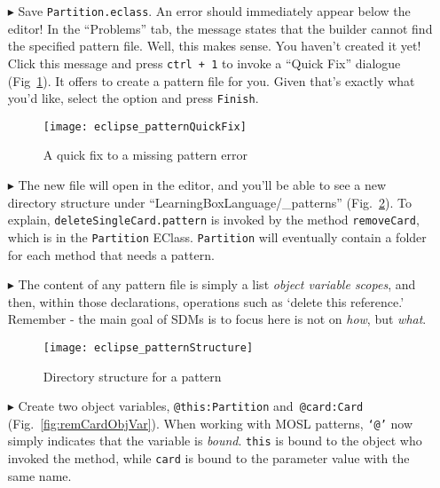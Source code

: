 \begin{itemize}
\item[$\blacktriangleright$] Save \texttt{Partition.eclass}. An error should immediately appear below the editor! In the ``Problems'' tab, the message
states that the builder cannot find the specified pattern file. Well, this makes sense. You haven't created it yet! Click this message and press \texttt{ctrl +
1} to invoke a ``Quick Fix'' dialogue (Fig~\ref{fig:quixFix}). It offers to create a pattern file for you. Given that's exactly what you'd like, select the option
and press \texttt{Finish}.

\vspace{0.5cm}

\begin{figure}[htp]
\begin{center}
  \texttt{[image: eclipse\_patternQuickFix]}
  \caption{A quick fix to a missing pattern error}
  \label{fig:quixFix}
\end{center}
\end{figure}

\item[$\blacktriangleright$] The new file will open in the editor, and you'll be able to see a new directory structure under ``LearningBoxLanguage/\_patterns''
(Fig.~\ref{fig:pattStruct}). To explain, \texttt{deleteSingleCard.pattern} is invoked by the method \texttt{removeCard}, which is in the \texttt{Partition}
EClass. \texttt{Partition} will eventually contain a folder for each method that needs a pattern.

\vspace{0.5cm}

\item[$\blacktriangleright$] The content of any pattern file is simply a list \emph{object variable scopes}, and then,
within those declarations, operations such as `delete this reference.' Remember - the main goal of SDMs is to focus here is not on \emph{how}, but
\emph{what}.

\newpage

\begin{figure}[htp]
\begin{center}
  \texttt{[image: eclipse\_patternStructure]}
  \caption{Directory structure for a pattern}
  \label{fig:pattStruct}
\end{center}
\end{figure}

\item[$\blacktriangleright$] Create two object variables, \texttt{@this:Partition} and~\texttt{@card:Card} (Fig.~\ref{fig:remCardObjVar}). When working with
MOSL patterns, \texttt{`@'} now simply indicates that the variable is \emph{bound}. \texttt{this} is bound to the object who invoked the method, while
\texttt{card} is bound to the parameter value with the same name.


\end{itemize}
